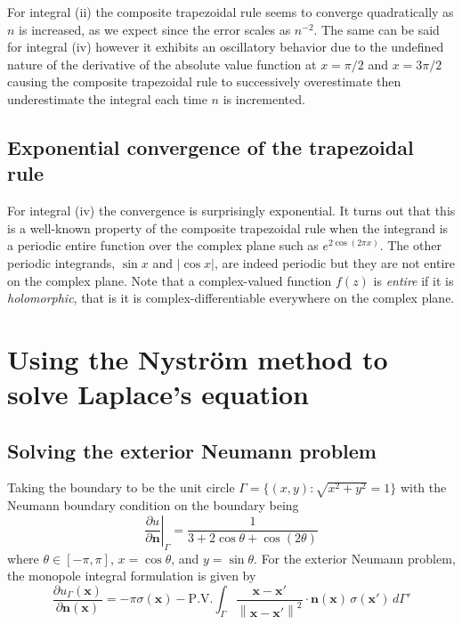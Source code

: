\documentclass[11pt]{article}
\newcommand\p[2]{\frac{\partial #1}{\partial #2}}
\newcommand{\norm}[1]{\left\lVert#1\right\rVert}
\begin{document}
For integral (ii) the composite trapezoidal rule seems to converge quadratically as $n$ is increased, as we expect since the error scales as $n^{-2}$. The same can be said for integral (iv) however it exhibits an oscillatory behavior due to the undefined nature of the derivative of the absolute value function at $x=\pi/2$ and $x=3\pi/2$ causing the composite trapezoidal rule to successively overestimate then underestimate the integral each time $n$ is incremented.

\subsection{Exponential convergence of the trapezoidal rule}

For integral (iv) the convergence is surprisingly exponential. It turns out that this is a well-known property of the composite trapezoidal rule when the integrand is a periodic entire function over the complex plane such as $e^{2\cos(2\pi x)}$. The other periodic integrands, $\sin x$ and $|\cos x|$, are indeed periodic but they are not entire on the complex plane. Note that a complex-valued function $f(z)$ is \emph{entire} if it is \emph{holomorphic}, that is it is complex-differentiable everywhere on the complex plane.

\section{Using the Nyström method to solve Laplace's equation}

\subsection{Solving the exterior Neumann problem}
Taking the boundary to be the unit circle $\Gamma = \{(x,y) : \sqrt{x^2 + y^2} = 1\}$ with the Neumann boundary condition on the boundary being
\begin{equation}
  \left. \p{u}{\bm{n}} \right\rvert_\Gamma =  \frac{1}{3 + 2\cos\theta + \cos(2\theta)}
\end{equation}
where $\theta \in [-\pi, \pi]$, $x = \cos\theta$, and $y = \sin\theta$. For the exterior Neumann problem, the monopole integral formulation is given by
\begin{equation}
  \p{u_\Gamma(\bm{x})}{\bm{n}(\bm{x})}
  = -\pi\sigma(\bm{x}) - \mathrm{P.V.}\int_\Gamma \frac{\bm{x-x'}}{\norm{\bm{x-x'}}^2} \cdot \bm{n}(\bm{x}) \, \sigma(\bm{x}') \, d\Gamma'
\end{equation}
\end{document}
